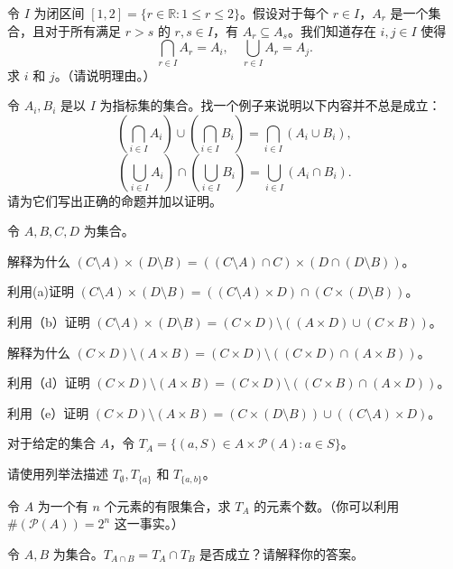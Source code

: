 \begin{problemset}
    \item 令 $I$ 为闭区间 $[1, 2] = \{r \in \mathbb{R} : 1 \leq r \leq 2\}$。假设对于每个 $r \in I$，$A_r$ 是一个集合，且对于所有满足 $r > s$ 的 $r, s \in I$，有 $A_r \subseteq A_s$。我们知道存在 $i, j \in I$ 使得
    $$ \bigcap_{r \in I} A_r = A_i, \quad \bigcup_{r \in I} A_r = A_j. $$
    求 $i$ 和 $j$。（请说明理由。）

    \item 令 $A_i, B_i$ 是以 $I$ 为指标集的集合。找一个例子来说明以下内容并不总是成立：
    $$ \left( \bigcap_{i \in I} A_i \right) \cup \left( \bigcap_{i \in I} B_i \right) = \bigcap_{i \in I} (A_i \cup B_i), $$
    $$ \left( \bigcup_{i \in I} A_i \right) \cap \left( \bigcup_{i \in I} B_i \right) = \bigcup_{i \in I} (A_i \cap B_i). $$
    请为它们写出正确的命题并加以证明。

    \item 令 $A, B, C, D$ 为集合。
    \begin{probenumerate}
        \item 解释为什么 $(C \setminus A) \times (D \setminus B) = ((C \setminus A) \cap C) \times (D \cap (D \setminus B))$。
        \item 利用(a)证明 $(C \setminus A) \times (D \setminus B) = ((C \setminus A) \times D) \cap (C \times (D \setminus B))$。
        \item 利用（b）证明 $(C \setminus A) \times (D \setminus B) = (C \times D) \setminus ((A \times D) \cup (C \times B))$。
        \item 解释为什么 $(C \times D) \setminus (A \times B) = (C \times D) \setminus ((C \times D) \cap (A \times B))$。
        \item 利用（d）证明 $(C \times D) \setminus (A \times B) = (C \times D) \setminus ((C \times B) \cap (A \times D))$。
        \item 利用（e）证明 $(C \times D) \setminus (A \times B) = (C \times (D \setminus B)) \cup ((C \setminus A) \times D)$。
    \end{probenumerate}

    \item 对于给定的集合 $A$，令 $T_A = \{(a, S) \in A \times \mathcal{P}(A) : a \in S\}$。
    \begin{probenumerate}
        \item 请使用列举法描述 $T_\emptyset, T_{\{a\}}$ 和 $T_{\{a,b\}}$。
        \item 令 $A$ 为一个有 $n$ 个元素的有限集合，求 $T_A$ 的元素个数。（你可以利用 $\#(\mathcal{P}(A)) = 2^n$ 这一事实。）
        \item 令 $A, B$ 为集合。$T_{A \cap B} = T_A \cap T_B$ 是否成立？请解释你的答案。
    \end{probenumerate}
\end{problemset}
